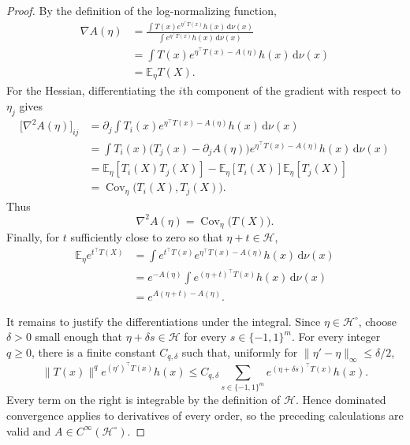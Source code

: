\begin{proof}
By the definition of the log-normalizing function,
\begin{align*}
\nabla A(\eta)
&=
\frac{\displaystyle\int T(x)e^{\eta^\top T(x)}h(x)\,\mathrm d\nu(x)}
{\displaystyle\int e^{\eta^\top T(x)}h(x)\,\mathrm d\nu(x)}\\
&=\int T(x)e^{\eta^\top T(x)-A(\eta)}h(x)\,\mathrm d\nu(x)\\
&=\mathbb E_\eta T(X).
\end{align*}
For the Hessian, differentiating the $i$th component of the gradient with
respect to $\eta_j$ gives
\begin{align*}
\bigl[\nabla^2 A(\eta)\bigr]_{ij}
&=\partial_j\int T_i(x)e^{\eta^\top T(x)-A(\eta)}h(x)\,\mathrm d\nu(x)\\
&=\int T_i(x)\bigl(T_j(x)-\partial_j A(\eta)\bigr)
e^{\eta^\top T(x)-A(\eta)}h(x)\,\mathrm d\nu(x)\\
&=\mathbb E_\eta[T_i(X)T_j(X)]
-\mathbb E_\eta[T_i(X)]\mathbb E_\eta[T_j(X)]\\
&=\operatorname{Cov}_\eta\bigl(T_i(X),T_j(X)\bigr).
\end{align*}
Thus
\[
\nabla^2 A(\eta)=\operatorname{Cov}_\eta\bigl(T(X)\bigr).
\]
Finally, for $t$ sufficiently close to zero so that $\eta+t\in\mathcal H$,
\begin{align*}
\mathbb E_\eta e^{t^\top T(X)}
&=\int e^{t^\top T(x)}e^{\eta^\top T(x)-A(\eta)}h(x)\,\mathrm d\nu(x)\\
&=e^{-A(\eta)}\int e^{(\eta+t)^\top T(x)}h(x)\,\mathrm d\nu(x)\\
&=e^{A(\eta+t)-A(\eta)}.
\end{align*}

It remains to justify the differentiations under the integral. Since
$\eta\in\mathcal H^\circ$, choose $\delta>0$ small enough that
$\eta+\delta s\in\mathcal H$ for every $s\in\{-1,1\}^m$.
For every integer $q\geq0$, there is a finite constant $C_{q,\delta}$ such
that, uniformly for $\lVert\eta'-\eta\rVert_\infty\leq\delta/2$,
\[
\lVert T(x)\rVert^q e^{(\eta')^\top T(x)}h(x)
\leq C_{q,\delta}\sum_{s\in\{-1,1\}^m}
e^{(\eta+\delta s)^\top T(x)}h(x).
\]
Every term on the right is integrable by the definition of $\mathcal H$.
Hence dominated convergence applies to derivatives of every order, so the
preceding calculations are valid and $A\in C^\infty(\mathcal H^\circ)$.
\end{proof}

